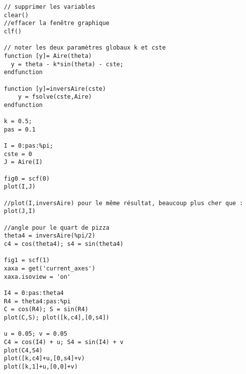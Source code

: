 \begin{verbatim}
// supprimer les variables
clear()
//effacer la fenêtre graphique
clf()

// noter les deux paramètres globaux k et cste
function [y]= Aire(theta)
  y = theta - k*sin(theta) - cste;
endfunction

function [y]=inversAire(cste)
    y = fsolve(cste,Aire)
endfunction

k = 0.5;
pas = 0.1

I = 0:pas:%pi;
cste = 0
J = Aire(I)

fig0 = scf(0)
plot(I,J)

//plot(I,inversAire) pour le même résultat, beaucoup plus cher que :
plot(J,I)

//angle pour le quart de pizza
theta4 = inversAire(%pi/2)
c4 = cos(theta4); s4 = sin(theta4)

fig1 = scf(1)
xaxa = get('current_axes')
xaxa.isoview = 'on'

I4 = 0:pas:theta4
R4 = theta4:pas:%pi
C = cos(R4); S = sin(R4)
plot(C,S); plot([k,c4],[0,s4])

u = 0.05; v = 0.05
C4 = cos(I4) + u; S4 = sin(I4) + v
plot(C4,S4)
plot([k,c4]+u,[0,s4]+v)
plot([k,1]+u,[0,0]+v)

\end{verbatim}
